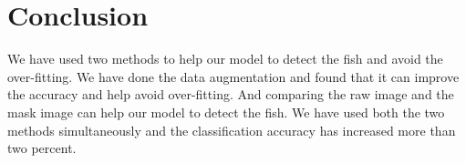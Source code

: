 \documentclass[conference]{IEEEtran}
\begin{document}
\section{Conclusion}
We have used two methods to help our model to detect the fish and avoid the over-fitting. We have done the data augmentation and found that it can improve the accuracy and help avoid over-fitting. And comparing the raw image and the mask image can help our model to detect the fish. We have used both the two methods simultaneously and the classification accuracy has increased more than two percent.


%
%
%






\end{document}

